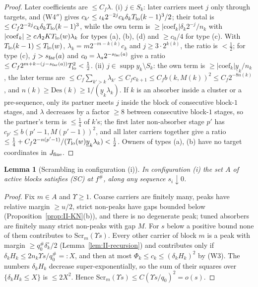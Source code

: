 \documentclass[10pt]{amsart}
\newtheorem{lemma}[theorem]{Lemma}
\theoremstyle{definition}
\theoremstyle{remark}
\newcommand{\supp}{\operatorname{supp}}
\begin{document}
\begin{proof}
Later coefficients are $\le C_f\lambda$.  (i) $j\in S_k$: later carriers meet $j$ only
through targets, and (W4$''$) gives $c_{k'}\le\iota_k2^{-2j}c_k\delta_kT_{\rm lo}(k-1)^3/2$; their
total is $\le C_f2^{-2j}c_k\delta_kT_{\rm lo}(k-1)^3$, while the own term is $\ge|\mathrm{coef}_k|
\delta_k2^{-j}/n_k$ with $|\mathrm{coef}_k|\ge cA_2KT_{\rm lo}(w)\lambda_k$ for types (a), (b), (d)
and $\ge c_0/4$ for type (c).  With $T_{\rm lo}(k-1)\le T_{\rm lo}(w)$, $\lambda_k=m2^{-m-k(k)}c_k$
and $j\ge3\cdot2^{k(k)}$, the ratio is $<\frac12$; for type (c), $j>s_{\rm far}(a)$ and
$c_0=\lambda_a2^{-s_{\rm far}(a)}$ give a ratio $\le C_f2^{m+k-(j-s_{\rm far}(a))}T_{\rm lo}^2<\frac12$.
(ii) $j\in\supp y_k\setminus S_k$: the own term is $\ge|\mathrm{coef}_k|\underline y_k/n_k$, the later
terms are $\le C_f\sum_{k'>k}\lambda_{k'}\le C_fc_{k+1}\le C_fb(k,M(k))^2\le C_f2^{-8n(k)}$,
and $n(k)\ge\mathrm{Des}(k)\ge1/(\underline y_k\lambda_k)$.  If $k$ is an absorber inside a cluster
or a pre-sequence, only its partner meets $j$ inside the block of consecutive
block-$1$ stages, and $\lambda$ decreases by a factor $\ge8$ between consecutive
block-$1$ stages, so the partner's term is $\le\frac14$ of $k$'s; the first later
non-absorber stage $p'$ has $c_{p'}\le b(p'-1,M(p'-1))^2$, and all later carriers
together give a ratio $\le\frac14+C_f2^{-n(p'-1)}/(T_{\rm lo}(w)\underline y_k\lambda_k)<\frac12$.
Owners of types (a), (b) have no target coordinates in $J_{\rm fine}$.
\end{proof}

\begin{lemma}[Scrambling in configuration (i)]\label{lem:II-SCi}
In configuration \textup{(i)} the set $A$ of active blocks satisfies \textup{(SC)} at
$f^\#$, along any sequence $s_i\downarrow0$.
\end{lemma}

\begin{proof}
Fix $m\in A$ and $\Upsilon\ge1$.  Coarse carriers are finitely many, peaks have relative
margin $\ge u/2$, strict non-peaks have gaps bounded below
(Proposition~\ref{prop:II-KN}(b)), and there is no degenerate peak; tuned
absorbers are finitely many strict non-peaks with gap $M$.  For $s$ below a
positive bound none of them contributes to $\mathrm{Scr}_m(\Upsilon s)$.  Every other
carrier of block $m$ is a peak with margin $\ge q^\#_0\delta^\circ_k/2$
(Lemma~\ref{lem:II-recursion}) and contributes only if $\delta_kH_k\le2n_k\Upsilon s/q^\#_0
=:X$, and then at most $\Phi_k\le c_k\le(\delta_kH_k)^2$ by (W3).  The numbers $\delta_kH_k$
decrease super-exponentially, so the sum of their squares over $\{\delta_kH_k\le X\}$ is
$\le2X^2$.  Hence $\mathrm{Scr}_m(\Upsilon s)\le C(\Upsilon s/q_0)^2=o(s)$.
\end{proof}
\end{document}
